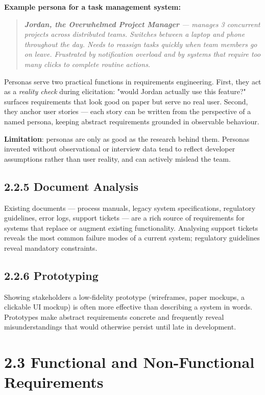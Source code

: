 \documentclass[11pt,a4paper]{book}
\begin{document}
\textbf{Example persona for a task management system:}

\begin{quote}
\textit{\textbf{Jordan, the Overwhelmed Project Manager} --- manages 3 concurrent projects across distributed teams. Switches between a laptop and phone throughout the day. Needs to reassign tasks quickly when team members go on leave. Frustrated by notification overload and by systems that require too many clicks to complete routine actions.}
\end{quote}

Personas serve two practical functions in requirements engineering. First, they act as a \textit{reality check} during elicitation: "would Jordan actually use this feature?" surfaces requirements that look good on paper but serve no real user. Second, they anchor user stories --- each story can be written from the perspective of a named persona, keeping abstract requirements grounded in observable behaviour.

\textbf{Limitation}: personas are only as good as the research behind them. Personas invented without observational or interview data tend to reflect developer assumptions rather than user reality, and can actively mislead the team.

\subsection{2.2.5 Document Analysis}

Existing documents --- process manuals, legacy system specifications, regulatory guidelines, error logs, support tickets --- are a rich source of requirements for systems that replace or augment existing functionality. Analysing support tickets reveals the most common failure modes of a current system; regulatory guidelines reveal mandatory constraints.

\subsection{2.2.6 Prototyping}

Showing stakeholders a low-fidelity prototype (wireframes, paper mockups, a clickable UI mockup) is often more effective than describing a system in words. Prototypes make abstract requirements concrete and frequently reveal misunderstandings that would otherwise persist until late in development.

\medskip

\section{2.3 Functional and Non-Functional Requirements}
\end{document}
